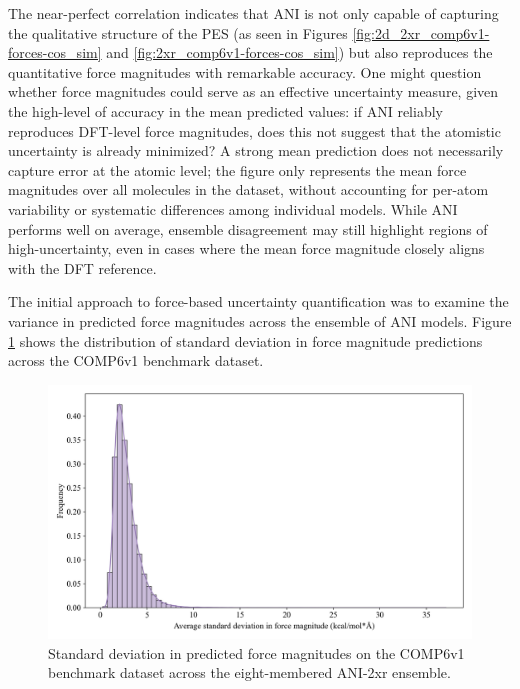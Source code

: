 The near-perfect correlation indicates that ANI is not only capable of capturing the qualitative structure of the PES (as seen in Figures \ref{fig:2d_2xr_comp6v1-forces-cos_sim} and \ref{fig:2xr_comp6v1-forces-cos_sim}) but also reproduces the quantitative force magnitudes with remarkable accuracy. 
One might question whether force magnitudes could serve as an effective uncertainty measure, given the high-level of accuracy in the mean predicted values: if ANI reliably reproduces DFT-level force magnitudes, does this not suggest that the atomistic uncertainty is already minimized? 
A strong mean prediction does not necessarily capture error at the atomic level; the figure only represents the mean force magnitudes over all molecules in the dataset, without accounting for per-atom variability or systematic differences among individual models.
While ANI performs well on average, ensemble disagreement may still highlight regions of high-uncertainty, even in cases where the mean force magnitude closely aligns with the DFT reference.

The initial approach to force-based uncertainty quantification was to examine the variance in predicted force magnitudes across the ensemble of ANI models. 
Figure \ref{fig:2xr_comp6v1-forces-stdev} shows the distribution of standard deviation in force magnitude predictions across the COMP6v1 benchmark dataset.

\begin{figure}[H]
    \centering
    \includegraphics[width=1\linewidth]{Images/2xr_forces/2xr_force_just_stdev.png}
    \caption[Standard deviation in predicted force magnitudes]{Standard deviation in predicted force magnitudes on the COMP6v1 benchmark dataset across the eight-membered ANI-2xr ensemble.}
    \label{fig:2xr_comp6v1-forces-stdev}
\end{figure}

